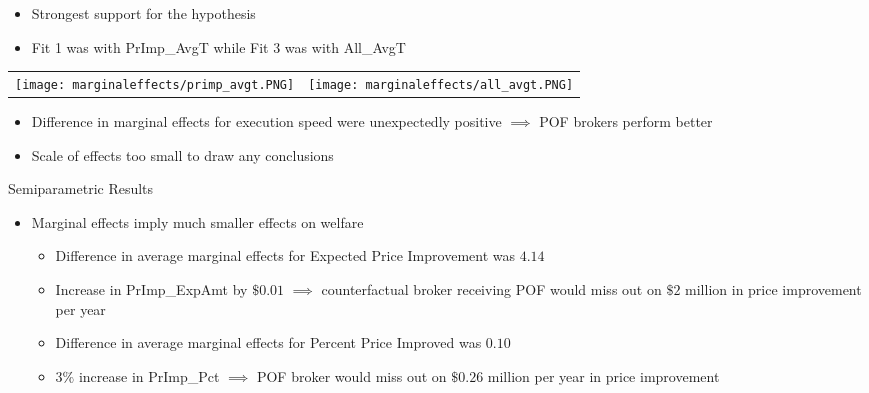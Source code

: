 \documentclass[11pt]{beamer}
\begin{document}
\begin{frame}


\begin{itemize}
	\setlength\itemsep{0.4em}
	\item Strongest support for the hypothesis 
	\item Fit 1 was with PrImp\_AvgT while Fit 3 was with All\_AvgT
\end{itemize}

\end{frame}

\begin{frame}

	\begin{table}[!htbp] 
		\label{} 
		\begin{tabular}{cc} 
			\texttt{[image: marginaleffects/primp\_avgt.PNG]} &\texttt{[image: marginaleffects/all\_avgt.PNG]}\\
		\end{tabular} 
	\end{table} 

	\begin{itemize}
		\setlength\itemsep{0.4em}
		\item Difference in marginal effects for execution speed were unexpectedly positive $\implies$ POF brokers perform better
		\item Scale of effects too small to draw any conclusions
	\end{itemize}

\end{frame}

\begin{frame}


\begin{block}
	{Semiparametric Results}

	\begin{itemize}	
		\item Marginal effects imply much smaller effects on welfare
		
		\begin{itemize}
			\setlength\itemsep{0.4em}
			\item Difference in average marginal effects for Expected Price Improvement was $4.14$
			\item Increase in PrImp\_ExpAmt by $\$0.01$ $\implies$ counterfactual broker receiving POF would miss out on $\$2$ million in price improvement per year
			\item Difference in average marginal effects for Percent Price Improved was $0.10$
			\item $3\%$ increase in PrImp\_Pct $\implies$ POF broker would miss out on $\$0.26$ million per year in price improvement
		\end{itemize}
	\end{itemize}
\end{block}


\end{frame}
\end{document}
